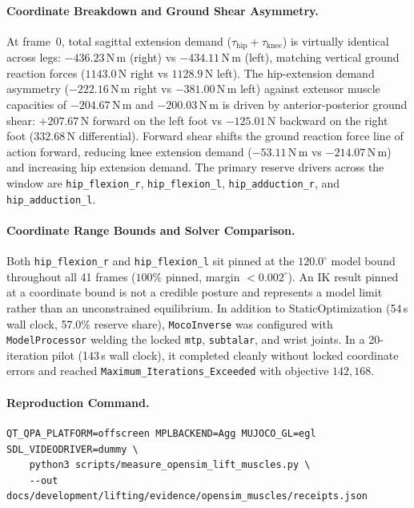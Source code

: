 \documentclass[11pt,a4paper]{article}
\begin{document}
\paragraph{Coordinate Breakdown and Ground Shear Asymmetry.}
At frame~0, total sagittal extension demand ($\tau_\text{hip} + \tau_\text{knee}$) is virtually
identical across legs: $-436.23\,\mathrm{N\,m}$ (right) vs $-434.11\,\mathrm{N\,m}$ (left),
matching vertical ground reaction forces ($1143.0\,\mathrm{N}$ right vs $1128.9\,\mathrm{N}$ left).
The hip-extension demand asymmetry ($-222.16\,\mathrm{N\,m}$ right vs $-381.00\,\mathrm{N\,m}$ left)
against extensor muscle capacities of $-204.67\,\mathrm{N\,m}$ and $-200.03\,\mathrm{N\,m}$
is driven by anterior-posterior ground shear: $+207.67\,\mathrm{N}$ forward on the left foot vs
$-125.01\,\mathrm{N}$ backward on the right foot ($332.68\,\mathrm{N}$ differential). Forward shear
shifts the ground reaction force line of action forward, reducing knee extension demand
($-53.11\,\mathrm{N\,m}$ vs $-214.07\,\mathrm{N\,m}$) and increasing hip extension demand.
The primary reserve drivers across the window are \texttt{hip\_flexion\_r}, \texttt{hip\_flexion\_l},
\texttt{hip\_adduction\_r}, and \texttt{hip\_adduction\_l}.

\paragraph{Coordinate Range Bounds and Solver Comparison.}
Both \texttt{hip\_flexion\_r} and \texttt{hip\_flexion\_l} sit pinned at the $120.0^\circ$ model
bound throughout all 41 frames ($100\%$ pinned, margin $< 0.002^\circ$). An IK result pinned at a
coordinate bound is not a credible posture and represents a model limit rather than an unconstrained
equilibrium.
In addition to StaticOptimization (54\,s wall clock, 57.0\% reserve share), \texttt{MocoInverse}
was configured with \texttt{ModelProcessor} welding the locked \texttt{mtp}, \texttt{subtalar},
and wrist joints. In a 20-iteration pilot (143\,s wall clock), it completed cleanly without locked
coordinate errors and reached \texttt{Maximum\_Iterations\_Exceeded} with objective $142{,}168$.

\paragraph{Reproduction Command.}
\begin{verbatim}
QT_QPA_PLATFORM=offscreen MPLBACKEND=Agg MUJOCO_GL=egl SDL_VIDEODRIVER=dummy \
    python3 scripts/measure_opensim_lift_muscles.py \
    --out docs/development/lifting/evidence/opensim_muscles/receipts.json
\end{verbatim}
\end{document}
